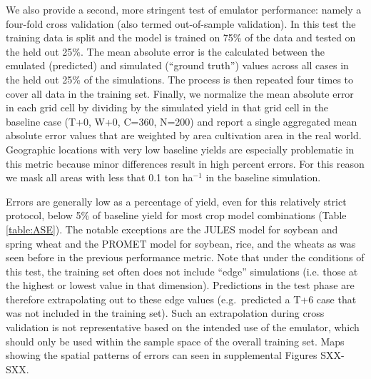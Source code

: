 \documentclass[gmd, manuscript]{copernicus} %
\begin{document}
We also provide a second, more stringent test of emulator performance: namely a four-fold cross validation (also termed out-of-sample validation). 
In this test the training data is split and the model is trained on 75\% of the data and tested on the held out 25\%.
The mean absolute error is the calculated between the emulated (predicted) and simulated (``ground truth'') values across all cases in the held out 25\% of the simulations. 
The process is then repeated four times to cover all data in the training set. 
Finally, we normalize the mean absolute error in each grid cell by dividing by the simulated yield in that grid cell in the baseline case (T+0, W+0, C=360, N=200) and report a single aggregated mean absolute error values that are weighted by area cultivation area in the real world. 
Geographic locations with very low baseline yields are especially problematic in this metric because minor differences result in high percent errors. 
For this reason we mask all areas with less that 0.1 ton ha$^{-1}$ in the baseline simulation. 

Errors are generally low as a percentage of yield, even for this relatively strict protocol, below 5\% of baseline yield for most crop model combinations (Table \ref{table:ASE}).
The notable exceptions are the JULES model for soybean and spring wheat and the PROMET model for soybean, rice, and the wheats as was seen before in the previous performance metric.
Note that under the conditions of this test, the training set often does not include ``edge'' simulations (i.e. those at the highest or lowest value in that dimension).
Predictions in the test phase are therefore extrapolating out to these edge values (e.g.\ predicted a T+6 case that was not included in the training set).
Such an extrapolation during cross validation is not representative based on the intended use of the emulator, which should only be used within the sample space of the overall training set.
Maps showing the spatial patterns of errors can seen in supplemental Figures SXX-SXX. 

\end{document}
